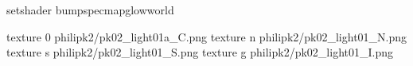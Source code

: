 setshader bumpspecmapglowworld

texture 0 philipk2/pk02_light01a_C.png
texture n philipk2/pk02_light01_N.png
texture s philipk2/pk02_light01_S.png
texture g philipk2/pk02_light01_I.png

